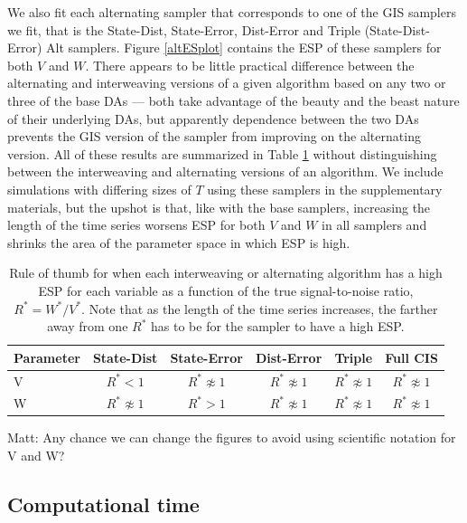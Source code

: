 \documentclass{article}
\newcommand{\matt}[1]{{\color{red} Matt: #1}}
\begin{document}
We also fit each alternating sampler that corresponds to one of the GIS samplers we fit, that is the State-Dist, State-Error, Dist-Error and Triple (State-Dist-Error) Alt samplers. Figure \ref{altESplot} contains the ESP of these samplers for both $V$ and $W$. There appears to be little practical difference between the alternating and interweaving versions of a given algorithm based on any two or three of the base DAs --- both take advantage of the beauty and the beast nature of their underlying DAs, but apparently dependence between the two DAs prevents the GIS version of the sampler from improving on the alternating version. All of these results are summarized in Table \ref{tab:stnmix2} without distinguishing between the interweaving and alternating versions of an algorithm. We include simulations with differing sizes of $T$ using these samplers in the supplementary materials, but the upshot is that, like with the base samplers, increasing the length of the time series worsens ESP for both $V$ and $W$ in all samplers and shrinks the area of the parameter space in which ESP is high.

\begin{table}
  \centering
  \begin{tabular}{|l|ccccc|}\hline
    Parameter & State-Dist        & State-Error       & Dist-Error        & Triple            & Full CIS \\\hline
    V         & $R^* < 1$           & $R^* \not\approx 1$ & $R^* \not\approx 1$ & $R^* \not\approx 1$ & $R^* \not\approx 1$ \\
    W         & $R^* \not\approx 1$ & $R^* > 1$           & $R^* \not\approx 1$ & $R^* \not\approx 1$ & $R^* \not\approx 1$\\\hline
  \end{tabular}
  \caption{Rule of thumb for when each interweaving or alternating algorithm has a high ESP for each variable as a function of the true signal-to-noise ratio, $R^*=W^*/V^*$. Note that as the length of the time series increases, the farther away from one $R^*$ has to be for the sampler to have a high ESP.}
  \label{tab:stnmix2}
\end{table}

\matt{Any chance we can change the figures to avoid using scientific notation for V and W?}

\subsection{Computational time}\label{sec:LLM:time}
\end{document}
